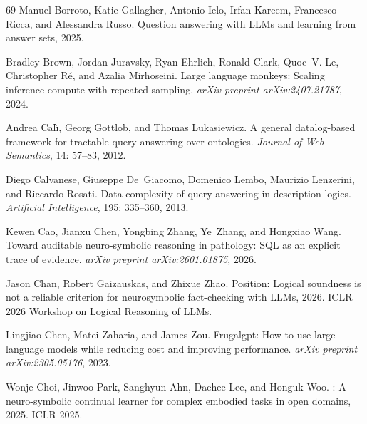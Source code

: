 \documentclass[11pt]{article}
\theoremstyle{plain}
\begin{document}
{\begin{thebibliography}{69}
Manuel Borroto, Katie Gallagher, Antonio Ielo, Irfan Kareem, Francesco Ricca,
  and Alessandra Russo.
\newblock Question answering with {LLM}s and learning from answer sets, 2025.

Bradley Brown, Jordan Juravsky, Ryan Ehrlich, Ronald Clark, Quoc~V. Le,
  Christopher R\'{e}, and Azalia Mirhoseini.
\newblock Large language monkeys: Scaling inference compute with repeated
  sampling.
\newblock \emph{arXiv preprint arXiv:2407.21787}, 2024.

Andrea Cal{\`\i}, Georg Gottlob, and Thomas Lukasiewicz.
\newblock A general datalog-based framework for tractable query answering over
  ontologies.
\newblock \emph{Journal of Web Semantics}, 14: 57--83, 2012.

Diego Calvanese, Giuseppe De~Giacomo, Domenico Lembo, Maurizio Lenzerini, and
  Riccardo Rosati.
\newblock Data complexity of query answering in description logics.
\newblock \emph{Artificial Intelligence}, 195: 335--360, 2013.

Kewen Cao, Jianxu Chen, Yongbing Zhang, Ye~Zhang, and Hongxiao Wang.
\newblock Toward auditable neuro-symbolic reasoning in pathology: {SQL} as an
  explicit trace of evidence.
\newblock \emph{arXiv preprint arXiv:2601.01875}, 2026.

Jason Chan, Robert Gaizauskas, and Zhixue Zhao.
\newblock Position: Logical soundness is not a reliable criterion for
  neurosymbolic fact-checking with {LLM}s, 2026.
\newblock ICLR 2026 Workshop on Logical Reasoning of LLMs.

Lingjiao Chen, Matei Zaharia, and James Zou.
\newblock Frugalgpt: How to use large language models while reducing cost and
  improving performance.
\newblock \emph{arXiv preprint arXiv:2305.05176}, 2023.

Wonje Choi, Jinwoo Park, Sanghyun Ahn, Daehee Lee, and Honguk Woo.
: A neuro-symbolic continual learner for complex embodied
  tasks in open domains, 2025.
\newblock ICLR 2025.


\end{thebibliography}}
\end{document}
